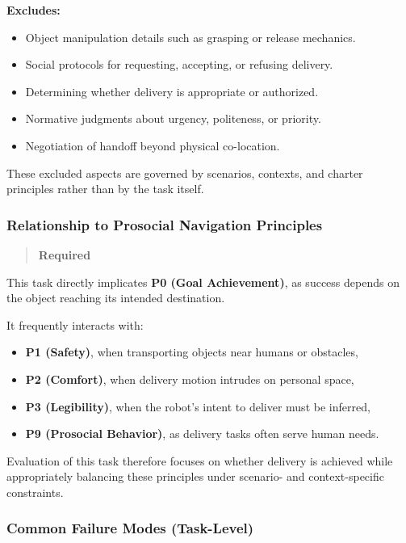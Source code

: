 \documentclass[utf8]{frontiers_suppmat} %
\providecommand{\tightlist}{%
  \setlength{\itemsep}{0pt}\setlength{\parskip}{0pt}}
\begin{document}
\textbf{Excludes:}

\begin{itemize}
\tightlist
\item
  Object manipulation details such as grasping or release mechanics.
\item
  Social protocols for requesting, accepting, or refusing delivery.
\item
  Determining whether delivery is appropriate or authorized.
\item
  Normative judgments about urgency, politeness, or priority.
\item
  Negotiation of handoff beyond physical co-location.
\end{itemize}

These excluded aspects are governed by scenarios, contexts, and charter
principles rather than by the task itself.

\subsubsection{Relationship to Prosocial Navigation
Principles}\label{relationship-to-prosocial-navigation-principles}

\begin{quote}
\textbf{Required}
\end{quote}

This task directly implicates \textbf{P0 (Goal Achievement)}, as success
depends on the object reaching its intended destination.

It frequently interacts with:

\begin{itemize}
\tightlist
\item
  \textbf{P1 (Safety)}, when transporting objects near humans or
  obstacles,
\item
  \textbf{P2 (Comfort)}, when delivery motion intrudes on personal
  space,
\item
  \textbf{P3 (Legibility)}, when the robot's intent to deliver must be
  inferred,
\item
  \textbf{P9 (Prosocial Behavior)}, as delivery tasks often serve human
  needs.
\end{itemize}

Evaluation of this task therefore focuses on whether delivery is
achieved while appropriately balancing these principles under scenario-
and context-specific constraints.

\subsubsection{Common Failure Modes
(Task-Level)}\label{common-failure-modes-task-level}
\end{document}
